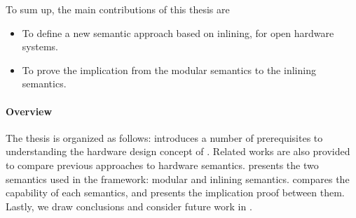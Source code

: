 To sum up, the main contributions of this thesis are
\begin{itemize}
\item To define a new semantic approach based on inlining, for open
  hardware systems.
\item To prove the implication from the modular semantics to the
  inlining semantics.
\end{itemize}

\paragraph{Overview}

The thesis is organized as follows: 
introduces a number of prerequisites to understanding the hardware
design concept of \Bluespec{}. Related works are also provided to
compare previous approaches to hardware
semantics.  presents the two semantics used in
the \Kami{} framework: modular and inlining
semantics.  compares the capability of each
semantics, and presents the implication proof between them. Lastly, we
draw conclusions and consider future work in
.

